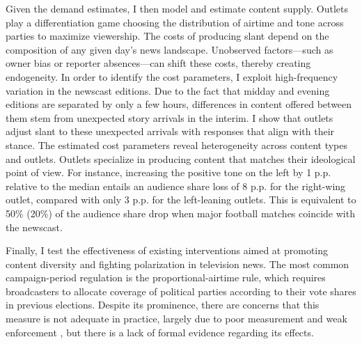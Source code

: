 \documentclass[12pt]{article}
\begin{document}
Given the demand estimates, I then model and estimate content supply. Outlets play a differentiation game choosing the distribution of airtime and tone across parties to maximize viewership. The costs of producing slant depend on the composition of any given day's news landscape. Unobserved factors—such as owner bias or reporter absences—can shift these costs, thereby creating endogeneity. In order to identify the  cost parameters, I exploit high-frequency variation in the newscast editions. Due to the fact that midday and evening editions are separated by only a few hours, differences in content offered between them stem from unexpected story arrivals in the interim. I show that outlets adjust slant to these unexpected arrivals with responses that align  with their stance. The estimated cost parameters reveal heterogeneity  across content types and  outlets. Outlets specialize in producing content that matches their ideological point of view. For instance, increasing the positive tone on the left by 1 p.p. relative to the median entails an audience share loss of 8 p.p. for the right-wing outlet, compared with only 3 p.p. for the left-leaning outlets. This is equivalent to 50\% (20\%) of the audience share drop when major football matches coincide with the newscast.





Finally, I test the effectiveness of existing  interventions aimed at promoting content diversity and fighting polarization in television news. The most common campaign-period regulation  is the proportional-airtime rule, which requires broadcasters to allocate coverage of political parties according to their vote shares in previous elections. Despite its prominence, there are concerns that this measure is not adequate in practice, largely due to poor measurement and weak enforcement \citep{cage_assemblee}, but there is a lack of formal evidence regarding its effects. 
\end{document}
